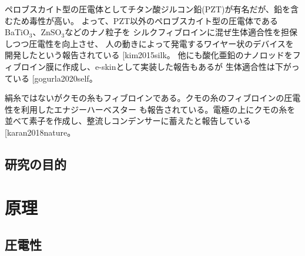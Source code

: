 \documentclass[dvipdfmx,12pt,a4paper]{jreport}
\makeatletter
\DeclareRobustCommand\cite{\unskip
    	\@ifnextchar[{\@tempswatrue\@citex}{\@tempswafalse\@citex[]}}
\makeatother
\begin{document}
			ペロブスカイト型の圧電体としてチタン酸ジルコン鉛(PZT)が有名だが、鉛を含むため毒性が高い。
			よって、PZT以外のペロブスカイト型の圧電体であるBaTiO$_3$、ZnSO$_3$などのナノ粒子を
			シルクフィブロインに混ぜ生体適合性を担保しつつ圧電性を向上させ、
			人の動きによって発電するワイヤー状のデバイスを開発したという報告されている\cite{kim2015silk}。
			他にも酸化亜鉛のナノロッドをフィブロイン膜に作成し、e-skinとして実装した報告もあるが
			生体適合性は下がっている\cite{gogurla2020self}。
			
			絹糸ではないがクモの糸もフィブロインである。クモの糸のフィブロインの圧電性を利用したエナジーハーベスター
			も報告されている。電極の上にクモの糸を並べて素子を作成し、整流しコンデンサーに蓄えたと報告している\cite{karan2018nature}。
			
		\newpage
		\section{研究の目的}

	\chapter{原理}
		\section{圧電性}
\end{document}
